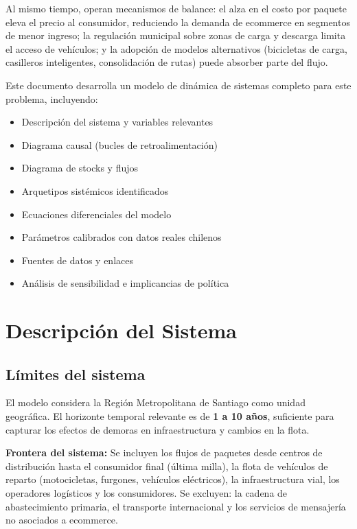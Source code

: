 \documentclass[12pt,a4paper]{article}
\begin{document}
Al mismo tiempo, operan mecanismos de balance: el alza en el costo
por paquete eleva el precio al consumidor, reduciendo la demanda de
ecommerce en segmentos de menor ingreso; la regulación municipal
sobre zonas de carga y descarga limita el acceso de vehículos;
y la adopción de modelos alternativos (bicicletas de carga,
casilleros inteligentes, consolidación de rutas) puede absorber
parte del flujo.

Este documento desarrolla un modelo de dinámica de sistemas completo
para este problema, incluyendo:
\begin{itemize}[leftmargin=1.5cm]
  \item Descripción del sistema y variables relevantes
  \item Diagrama causal (bucles de retroalimentación)
  \item Diagrama de stocks y flujos
  \item Arquetipos sistémicos identificados
  \item Ecuaciones diferenciales del modelo
  \item Parámetros calibrados con datos reales chilenos
  \item Fuentes de datos y enlaces
  \item Análisis de sensibilidad e implicancias de política
\end{itemize}

\section{Descripción del Sistema}

\subsection{Límites del sistema}

El modelo considera la Región Metropolitana de Santiago como unidad
geográfica. El horizonte temporal relevante es de \textbf{1 a 10 años},
suficiente para capturar los efectos de demoras en infraestructura y
cambios en la flota.

\begin{definicion}
\textbf{Frontera del sistema:} Se incluyen los flujos de paquetes desde
centros de distribución hasta el consumidor final (última milla), la
flota de vehículos de reparto (motocicletas, furgones, vehículos eléctricos),
la infraestructura vial, los operadores logísticos y los consumidores.
Se excluyen: la cadena de abastecimiento primaria, el transporte
internacional y los servicios de mensajería no asociados a ecommerce.
\end{definicion}
\end{document}
